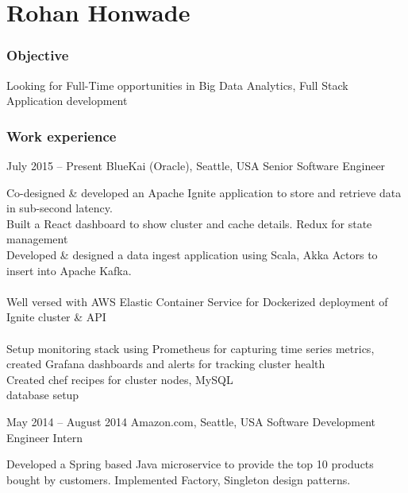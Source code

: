 \documentclass{tccv}
\begin{document}
\part{Rohan Honwade}

\section{Objective}
Looking for Full-Time opportunities in Big Data Analytics, Full Stack Application development

\section{Work experience}
\begin{eventlist}
\item{July 2015 -- Present}
     {BlueKai (Oracle), Seattle, USA}
     {Senior Software Engineer}
     
Co-designed \& developed an Apache Ignite application to store and retrieve data in sub-second latency.\\

Built a React dashboard to show cluster and cache details. Redux for state management\\

Developed \& designed a data ingest application using Scala, Akka Actors to insert into Apache Kafka.\\
\\

Well versed with AWS Elastic Container Service for Dockerized deployment of Ignite cluster \& API\\
\\


Setup monitoring stack using Prometheus for capturing time series metrics, created Grafana dashboards and alerts for tracking cluster health\\

Created chef recipes for cluster nodes, MySQL\\ database setup

\item{May 2014 -- August 2014}
     {Amazon.com, Seattle, USA}
     {Software Development Engineer Intern}

Developed a Spring based Java microservice to provide the top 10 products bought by customers. Implemented Factory, Singleton design patterns.\\


\end{eventlist}
\end{document}
